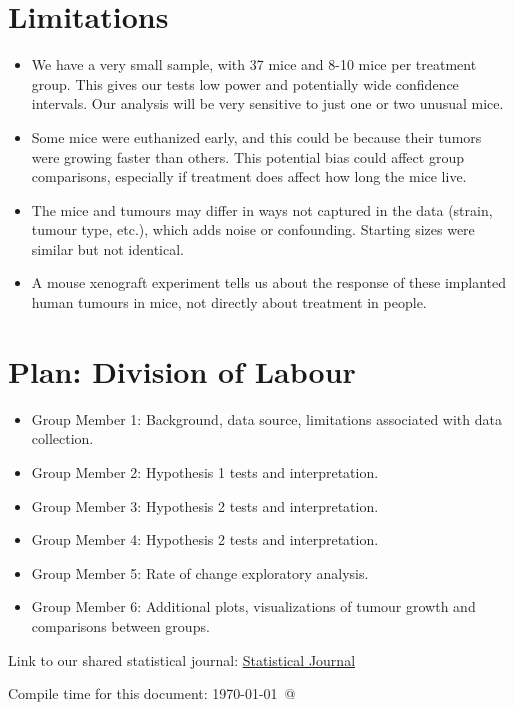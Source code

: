 \documentclass[12pt]{article}\usepackage[]{graphicx}\usepackage[]{xcolor}
\begin{document}
\section{Limitations}

\begin{itemize}

\item We have a very small sample, with 37 mice and 8-10 mice per treatment group. This gives our tests low power and potentially wide confidence intervals. Our analysis will be very sensitive to just one or two unusual mice. 

\item Some mice were euthanized early, and this could be because their tumors were growing faster than others. This potential bias could affect group comparisons, especially if treatment does affect how long the mice live.

\item The mice and tumours may differ in ways not captured in the data (strain, tumour type, etc.), which adds noise or confounding. Starting sizes were similar but not identical.

\item A mouse xenograft experiment tells us about the response of these implanted human tumours in mice, not directly about treatment in people.

\end{itemize}





\section{Plan: Division of Labour}

\begin{itemize} 

\item Group Member 1: Background, data source, limitations associated with data collection.


\item Group Member 2: Hypothesis 1 tests and interpretation.

\item Group Member 3: Hypothesis 2 tests and interpretation.

\item Group Member 4: Hypothesis 2 tests and interpretation.

\item Group Member 5: Rate of change exploratory analysis.

\item Group Member 6: Additional plots, visualizations of tumour growth and comparisons between groups. 

\end{itemize}

\bigskip

Link to our shared statistical journal: \href{https://docs.google.com/document/d/1BKvKi0EO3Ac-XwjodCFHskrI4mpMirMIUUGpHSIPYTE/edit?usp=sharing}{Statistical Journal}


\bigskip
Compile time for this document:
\today\ @ \thistime
\end{document}
